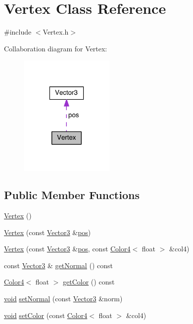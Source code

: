 \hypertarget{class_vertex}{\section{Vertex Class Reference}
\label{class_vertex}
}


{\ttfamily \#include $<$Vertex.\-h$>$}



Collaboration diagram for Vertex\-:
\nopagebreak
\begin{figure}[H]
\begin{center}
\leavevmode
\includegraphics[width=130pt]{class_vertex__coll__graph}
\end{center}
\end{figure}
\subsection*{Public Member Functions}
\begin{DoxyCompactItemize}
\item 
\hyperlink{class_vertex_a97488994a2482d70da74e1b91d40e169}{Vertex} ()
\item 
\hyperlink{class_vertex_a9c0718ed0acc12c06c4e6626e444e38a}{Vertex} (const \hyperlink{class_vector3}{Vector3} \&\hyperlink{class_vertex_aff9e2cd90a083d800a53100bccb26921}{pos})
\item 
\hyperlink{class_vertex_a2e31b69604b07a7e0bb0c05378ec101d}{Vertex} (const \hyperlink{class_vector3}{Vector3} \&\hyperlink{class_vertex_aff9e2cd90a083d800a53100bccb26921}{pos}, const \hyperlink{class_color4}{Color4}$<$ float $>$ \&col4)
\item 
const \hyperlink{class_vector3}{Vector3} \& \hyperlink{class_vertex_ae234a210ab90326f794b7f31441f8927}{get\-Normal} () const 
\item 
\hyperlink{class_color4}{Color4}$<$ float $>$ \hyperlink{class_vertex_a2155b0a433fcf403f739d9a80a2d8410}{get\-Color} () const 
\item 
\hyperlink{glutf90_8h_ac778d6f63f1aaf8ebda0ce6ac821b56e}{void} \hyperlink{class_vertex_ae80b4ec067262e3604fe396f4f21944b}{set\-Normal} (const \hyperlink{class_vector3}{Vector3} \&norm)
\item 
\hyperlink{glutf90_8h_ac778d6f63f1aaf8ebda0ce6ac821b56e}{void} \hyperlink{class_vertex_ad9b0c13c8fbd3f9254ec1d4f6992e178}{set\-Color} (const \hyperlink{class_color4}{Color4}$<$ float $>$ \&col4)
\end{DoxyCompactItemize}
